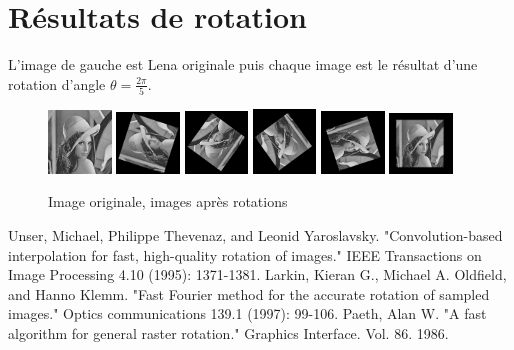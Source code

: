 \documentclass[12pt]{article}
\begin{document}
\section*{Résultats de rotation}
L'image de gauche est Lena originale puis chaque image est le résultat d'une rotation d'angle $\theta = \frac{2\pi}{5}$.

\begin{figure}[h]
	\includegraphics[width=0.15\textwidth]{lena.png}
	\includegraphics[width=0.15\textwidth]{rotation_2pi_1.png}
	\includegraphics[width=0.15\textwidth]{rotation_2pi_2.png}
	\includegraphics[width=0.15\textwidth]{rotation_2pi_3.png}
	\includegraphics[width=0.15\textwidth]{rotation_2pi_4.png}
	\includegraphics[width=0.15\textwidth]{rotation_2pi_5.png}
  \caption{Image originale, images après rotations}
\end{figure}

\begin{thebibliography}{2}

  Unser, Michael, Philippe Thevenaz, and Leonid Yaroslavsky. 
  "Convolution-based interpolation for fast, high-quality rotation of images." 
  IEEE Transactions on Image Processing 4.10 (1995): 1371-1381.
  Larkin, Kieran G., Michael A. Oldfield, and Hanno Klemm. 
  "Fast Fourier method for the accurate rotation of sampled images." 
  Optics communications 139.1 (1997): 99-106.
	Paeth, Alan W. 
	"A fast algorithm for general raster rotation." 
	Graphics Interface. Vol. 86. 1986.

\end{thebibliography}
\end{document}
